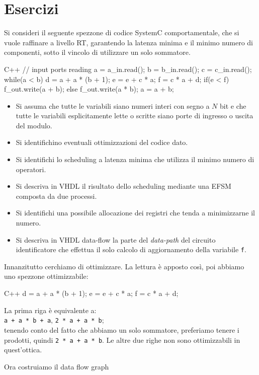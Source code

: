 \documentclass[10pt,a4paper,oneside]{scrbook}
\begin{document}
\chapter{Esercizi}
Si consideri il seguente spezzone di codice SystemC comportamentale, che si vuole raffinare a livello RT, garantendo
la latenza minima e il minimo numero di componenti, sotto il vincolo di utilizzare un solo sommatore.
\begin{sourcecode}{C++}
    // input ports reading
    a = a_in.read();
    b = b_in.read();
    c = c_in.read();
    while(a < b){
        d = a + a * (b + 1);
        e = e + c * a;
        f = c * a + d;
        if(e < f)
            f_out.write(a + b);
        else
            f_out.write(a * b);
        a = a + b;
    }
\end{sourcecode}
\begin{itemize}
    \item Si assuma che tutte le variabili siano numeri interi con segno a $N$ bit e che tutte le variabili esplicitamente
    lette o scritte siano porte di ingresso o uscita del modulo.
    \item Si identifichino eventuali ottimizzazioni del codice dato.
    \item Si identifichi lo scheduling a latenza minima che utilizza il minimo numero di operatori.
    \item Si descriva in VHDL il risultato dello scheduling mediante una EFSM composta da due processi.
    \item Si identifichi una possibile allocazione dei registri che tenda a minimizzarne il numero.
    \item Si descriva in VHDL data-flow la parte del \textit{data-path} del circuito identificatore che effettua
    il solo calcolo di aggiornamento della variabile \texttt{f}.
\end{itemize}
Innanzitutto cerchiamo di ottimizzare. La lettura è apposto così, poi abbiamo uno spezzone ottimizzabile:
\begin{sourcecode}{C++}
        d = a + a * (b + 1);
        e = e + c * a;
        f = c * a + d;
\end{sourcecode}
La prima riga è equivalente a:\\
\texttt{a + a * b + a}, \texttt{2 * a + a * b};\\
tenendo conto del fatto che abbiamo un solo sommatore, preferiamo tenere i prodotti, quindi \texttt{2 * a + a * b}.
Le altre due righe non sono ottimizzabili in quest'ottica.

Ora costruiamo il data flow graph
\end{document}
